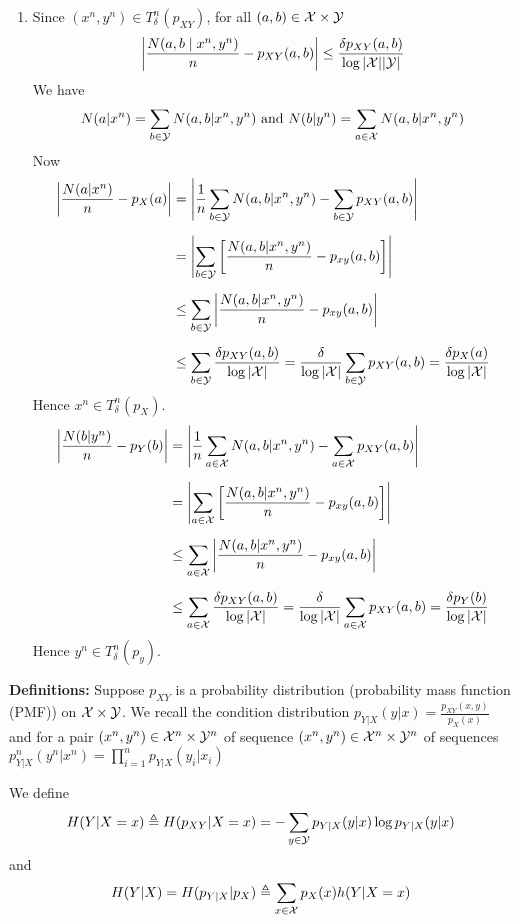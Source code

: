 \documentclass[a4paper, 11pt]{article}
\begin{document}
{\begin{enumerate}
		\item Since $(x^n,y^n)\in T_{\delta}^n(p_{XY})$, for all $(a,b)\in \mathcal{X}\times \mathcal{Y}$ $$\left|\frac{N(a,b\mid x^n,y^n)}{n}-p_{XY}(a,b)  \right| \leq \frac{\delta p_{XY}(a,b)}{\log |\mathcal{X}||\mathcal{Y}|}$$We have  $$N(a|x^n)=\sum_{b\in \mathcal{Y}}N(a,b|x^n,y^n)\text{ and }N(b|y^n)=\sum_{a\in \mathcal{X}}N(a,b|x^n,y^n)$$ Now \begin{align*}
			\left| \frac{N(a|x^n)}{n}-p_X(a) \right| & =\left| \frac1n\sum_{b\in\mathcal{Y}}N(a,b|x^n,y^n)  -\sum_{b\in \mathcal{Y}}p_{XY}(a,b) \right|\\[2mm]
			& = \left| \sum_{b\in \mathcal{Y}}\left[\frac{N(a,b|x^n,y^n)}n-p_{xy}(a,b)\right] \right|\\[2mm]
			& \leq \sum_{b\in \mathcal{Y}}\left| \frac{N(a,b|x^n,y^n)}n-p_{xy}(a,b) \right|\\[2mm]
			& \leq \sum_{b\in \mathcal{Y}}\frac{\delta p_{XY}(a,b)}{\log |\mathcal{X}|} = \frac{\delta}{\log |\mathcal{X}|}\sum_{b\in \mathcal{Y}}p_{XY}(a,b)= \frac{\delta p_X(a)}{\log |\mathcal{X}|}
		\end{align*} Hence $x^n\in T_{\delta}^n(p_X)$.
		\begin{align*}
			\left| \frac{N(b|y^n)}{n}-p_Y(b) \right| & =\left| \frac1n\sum_{a\in\mathcal{X}}N(a,b|x^n,y^n)  -\sum_{a\in \mathcal{X}}p_{XY}(a,b) \right|\\[2mm]
			& = \left| \sum_{a\in\mathcal{X}}\left[\frac{N(a,b|x^n,y^n)}n-p_{xy}(a,b)\right] \right|\\[2mm]
			& \leq \sum_{a\in\mathcal{X}}\left| \frac{N(a,b|x^n,y^n)}n-p_{xy}(a,b) \right|\\[2mm]
			& \leq \sum_{a\in\mathcal{X}}\frac{\delta p_{XY}(a,b)}{\log |\mathcal{X}|} = \frac{\delta}{\log |\mathcal{X}|}\sum_{a\in\mathcal{X}}p_{XY}(a,b)= \frac{\delta p_Y(b)}{\log |\mathcal{X}|}
		\end{align*} Hence $y^n\in T_{\delta}^n(p_y)$.
	\end{enumerate}
}

\pagebreak

 \parinf \textbf{Definitions:} Suppose $p_{XY}$ is a probability distribution (probability mass function (PMF)) on $\mathcal{X}\times \mathcal{Y}$. We recall the condition distribution $p_{Y|X}(y|x)=\frac{p_{XY}(x,y)}{p_X(x)}$ and  for a pair $(x^n,y^n)\in \mathcal{X}^n\times \mathcal{Y}^n$ of sequence $(x^n,y^n)\in \mathcal{X}^n\times \mathcal{Y}^n$ of sequences $p_{Y|X}^n(y^n|x^n)=\prod\limits_{i=1}^np_{Y|X}(y_i|x_i)$\parinn
 	
 We define $$H(Y|X=x)\triangleq H(p_{XY}|X=x)=-\sum_{y\in \mathcal{Y}}p_{Y|X}(y|x)\log p_{Y|X}(y|x)$$ and $$H(Y|X)=H(p_{Y|X}|p_X)\triangleq \sum_{x\in \mathcal{X}}p_X(x)h(Y|X=x)$$
 
\end{document}
